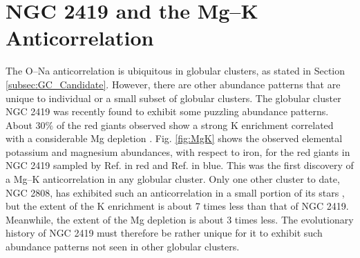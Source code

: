 \section{NGC 2419 and the Mg--K Anticorrelation} \label{sec:NGC2419}



The O--Na anticorrelation is ubiquitous in globular clusters, as stated in Section \ref{subsec:GC_Candidate}. However, there are other abundance patterns that are unique to individual or a small subset of globular clusters. The globular cluster NGC 2419 was recently found to exhibit some puzzling abundance patterns. About 30$\%$ of the red giants observed show a strong K enrichment correlated with a considerable Mg depletion \cite{Mucciarelli2012,Cohen2012}. Fig. \ref{fig:MgK} shows the observed elemental potassium and magnesium abundances, with respect to iron, for the red giants in NGC 2419 sampled by Ref. \cite{Mucciarelli2012} in red and Ref. \cite{Cohen2012} in blue. This was the first discovery of a Mg--K anticorrelation in any globular cluster. Only one other cluster to date, NGC 2808, has exhibited such an anticorrelation in a small portion of its stars \cite{Mucciarelli2015,Mucciarelli2017}, but the extent of the K enrichment is about 7 times less than that of NGC 2419. Meanwhile, the extent of the Mg depletion is about 3 times less. The evolutionary history of NGC 2419 must therefore be rather unique for it to exhibit such abundance patterns not seen in other globular clusters.


